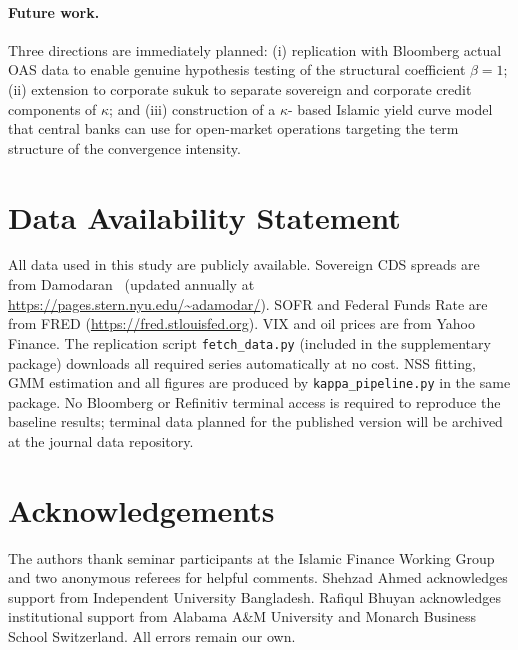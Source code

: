 \documentclass[12pt]{article}
\theoremstyle{plain}
\theoremstyle{definition}
\theoremstyle{remark}
\begin{document}
\paragraph{Future work.}
Three directions are immediately planned: (i) replication with Bloomberg actual
OAS data to enable genuine hypothesis testing of the structural coefficient
$\beta = 1$; (ii) extension to corporate sukuk to separate sovereign and
corporate credit components of $\kappa$; and (iii) construction of a $\kappa$-
based Islamic yield curve model that central banks can use for open-market
operations targeting the term structure of the convergence intensity.

\section*{Data Availability Statement}

All data used in this study are publicly available. Sovereign CDS spreads are
from Damodaran~\cite{Damodaran2026} (updated annually at
\url{https://pages.stern.nyu.edu/~adamodar/}). SOFR and Federal Funds Rate are
from FRED (\url{https://fred.stlouisfed.org}). VIX and oil prices are from
Yahoo Finance. The replication script \texttt{fetch\_data.py} (included in the
supplementary package) downloads all required series automatically at no cost.
NSS fitting, GMM estimation and all figures are produced by
\texttt{kappa\_pipeline.py} in the same package. No Bloomberg or Refinitiv
terminal access is required to reproduce the baseline results; terminal data
planned for the published version will be archived at the journal data
repository.

\section*{Acknowledgements}

The authors thank seminar participants at the Islamic Finance Working Group and
two anonymous referees for helpful comments. Shehzad Ahmed acknowledges
support from Independent University Bangladesh. Rafiqul Bhuyan acknowledges
institutional support from Alabama A\&M University and Monarch Business School
Switzerland. All errors remain our own.
\end{document}
